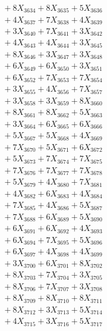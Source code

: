 \documentclass[a4paper,10pt]{article}
\begin{document}
{\begin{align}
&\;  + 8 X_{3634} + 8 X_{3635} + 5 X_{3636} \\[0.3ex]
&\;  + 4 X_{3637} + 7 X_{3638} + 4 X_{3639} \\[0.5ex]\allowbreak
&\;  + 3 X_{3640} + 7 X_{3641} + 3 X_{3642} \\[0.3ex]
&\;  + 4 X_{3643} + 4 X_{3644} + 3 X_{3645} \\[0.3ex]
&\;  + 8 X_{3646} + 3 X_{3647} + 3 X_{3648} \\[0.3ex]
&\;  + 6 X_{3649} + 6 X_{3650} + 3 X_{3651} \\[0.3ex]
&\;  + 6 X_{3652} + 7 X_{3653} + 7 X_{3654} \\[0.3ex]
&\;  + 3 X_{3655} + 4 X_{3656} + 7 X_{3657} \\[0.3ex]
&\;  + 3 X_{3658} + 3 X_{3659} + 8 X_{3660} \\[0.3ex]
&\;  + 8 X_{3661} + 8 X_{3662} + 5 X_{3663} \\[0.3ex]
&\;  + 3 X_{3664} + 6 X_{3665} + 6 X_{3666} \\[0.3ex]
&\;  + 5 X_{3667} + 5 X_{3668} + 4 X_{3669} \\[0.5ex]\allowbreak
&\;  + 7 X_{3670} + 5 X_{3671} + 6 X_{3672} \\[0.3ex]
&\;  + 5 X_{3673} + 7 X_{3674} + 7 X_{3675} \\[0.3ex]
&\;  + 7 X_{3676} + 7 X_{3677} + 7 X_{3678} \\[0.3ex]
&\;  + 5 X_{3679} + 4 X_{3680} + 7 X_{3681} \\[0.3ex]
&\;  + 4 X_{3682} + 6 X_{3683} + 4 X_{3684} \\[0.3ex]
&\;  + 7 X_{3685} + 4 X_{3686} + 5 X_{3687} \\[0.3ex]
&\;  + 7 X_{3688} + 6 X_{3689} + 5 X_{3690} \\[0.3ex]
&\;  + 6 X_{3691} + 6 X_{3692} + 4 X_{3693} \\[0.3ex]
&\;  + 6 X_{3694} + 7 X_{3695} + 5 X_{3696} \\[0.3ex]
&\;  + 6 X_{3697} + 4 X_{3698} + 4 X_{3699} \\[0.5ex]\allowbreak
&\;  + 3 X_{3700} + 6 X_{3701} + 8 X_{3702} \\[0.3ex]
&\;  + 8 X_{3703} + 7 X_{3704} + 3 X_{3705} \\[0.3ex]
&\;  + 8 X_{3706} + 7 X_{3707} + 3 X_{3708} \\[0.3ex]
&\;  + 8 X_{3709} + 8 X_{3710} + 8 X_{3711} \\[0.3ex]
&\;  + 8 X_{3712} + 3 X_{3713} + 5 X_{3714} \\[0.3ex]
&\;  + 4 X_{3715} + 3 X_{3716} + 5 X_{3717} \\[0.3ex]

\end{align}}
\end{document}
